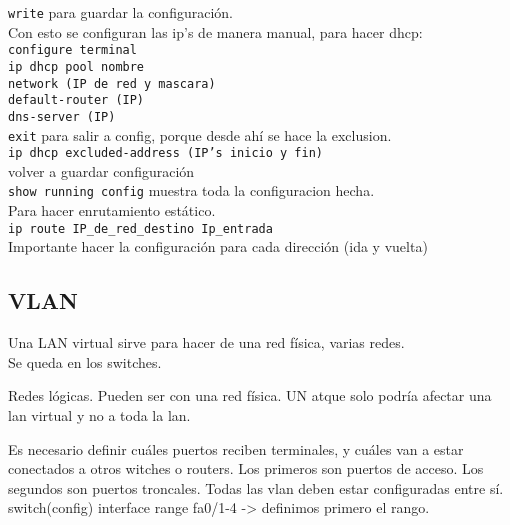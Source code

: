 \texttt{write} para guardar la configuración. \\

Con esto se configuran las ip's de manera manual, para hacer dhcp: \\

\texttt{configure terminal} \\
\texttt{ip dhcp pool nombre} \\
\texttt{network (IP de red y mascara)} \\
\texttt{default-router (IP)} \\
\texttt{dns-server (IP)} \\
\texttt{exit} para salir a config, porque desde ahí se hace la exclusion. \\
\texttt{ip dhcp excluded-address (IP's inicio y fin)} \\
    
volver a guardar configuración \\


\texttt{show running config} muestra toda la configuracion hecha.\\


Para hacer enrutamiento estático.\\

\texttt{ip route IP\_de\_red\_destino Ip\_entrada} \\

Importante hacer la configuración para cada dirección (ida y vuelta)



\texttt{}



\subsection{VLAN}

Una LAN virtual sirve para hacer de una red física, varias redes. \\

Se queda en los switches.

Redes lógicas. Pueden ser con una red física. UN atque solo podría afectar una lan virtual y no a toda la lan.

Es necesario definir cuáles puertos reciben terminales, y cuáles van a estar conectados a otros witches o routers. Los primeros son puertos de acceso. Los segundos son puertos troncales. Todas las vlan deben estar configuradas entre sí. \\

switch(config) interface range fa0/1-4 -> definimos primero el rango. \\

